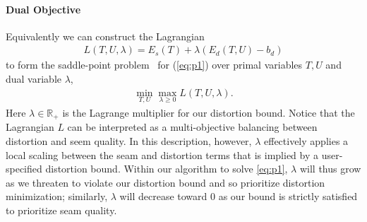 
\paragraph{Dual Objective}

Equivalently we can construct the Lagrangian
\begin{align}
	L(T,U,\lambda) = E_s(T) + \lambda(E_d(T,U) - b_d) 
	\label{eq:L}
\end{align}
to form the saddle-point problem~\cite{} for (\ref{eq:p1}) over primal variables $T,U$ and dual variable $\lambda$,
\begin{align}
	\min_{T,U} \max_{\lambda\geq0} L(T,U,\lambda).
	\label{eq:p2}
\end{align}
%
Here $\lambda \in \mathbb{R_+}$ is the Lagrange multiplier for our distortion bound. Notice that the Lagrangian $L$ can be interpreted as a multi-objective balancing between distortion and seem quality. In this description, however, $\lambda$ effectively applies a local scaling between the seam and distortion terms that is implied %
by a user-specified distortion bound. Within our algorithm to solve \eqref{eq:p1}, $\lambda$ will thus grow as we threaten to violate our distortion bound and so prioritize distortion minimization; similarly, $\lambda$ will decrease toward $0$ as our bound is strictly satisfied to prioritize seam quality.






